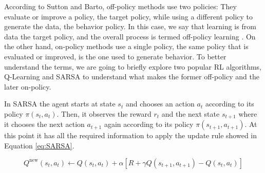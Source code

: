 According to Sutton and Barto, off-policy methods use two policies: They evaluate or improve a policy, the target policy, while using a different policy to generate the data, the behavior policy. In this case, we say that learning is from data  the target policy, and the overall process is termed off-policy learning \cite{Sutton:1998}. On the other hand, on-policy methods use a single policy, the same policy that is evaluated or improved, is the one used to generate behavior. 
To better understand the terms, we are going to briefly explore two popular RL algorithms, Q-Learning \cite{Watkins:1989} and SARSA \cite{Rummery+Niranjan:1994} to understand what makes the former off-policy and the later on-policy.







In SARSA the agent starts at state $s_t$ and chooses an action $a_t$ according to its policy $\pi(s_t, a_t)$. Then, it observes the reward $r_t$ and the next state $s_{t+1}$ where it chooses the next action $a_{t+1}$ again according to its policy $\pi(s_{t+1}, a_{t+1})$. At this point it has all the required information to apply the update rule showed in Equation \eqref{eq:SARSA}.

\begin{equation}
Q^{\text{new}}(s_t, a_t)  \leftarrow Q(s_t, a_t) + \alpha \left[R+ \gamma  Q(s_{t+1}, a_{t+1}) - Q(s_t, a_t)\right]
\label{eq:SARSA}
\end{equation}


